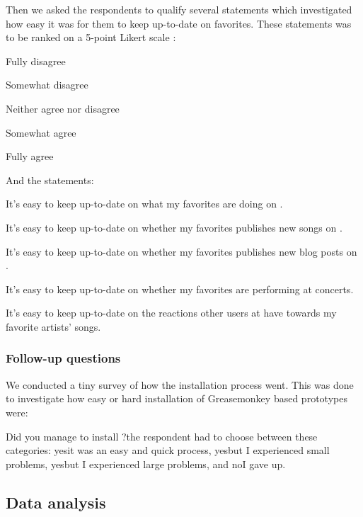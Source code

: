Then we asked the respondents to qualify several statements which investigated
how easy it was for them to keep up-to-date on favorites.
These statements
was to be ranked on a 5-point Likert scale \citep{likert32}:

\begin{items}
  \item Fully disagree
  \item Somewhat disagree
  \item Neither agree nor disagree
  \item Somewhat agree
  \item Fully agree
\end{items}

And the statements:

\begin{items}
  \item It's easy to keep up-to-date on what my favorites are doing
    on \urort{}.
  \item It's easy to keep up-to-date on whether my favorites publishes
    new songs on \urort{}.
  \item It's easy to keep up-to-date on whether my favorites publishes
    new blog posts on \urort{}.
  \item It's easy to keep up-to-date on whether my favorites are
    performing at concerts.
  \item It's easy to keep up-to-date on the reactions other users at
    \urort{} have towards my favorite artists' songs.
\end{items}

\subsubsection{Follow-up questions}

We conducted a tiny survey of how the installation process went. This
was done to investigate how easy or hard installation of Greasemonkey based
prototypes were:

\begin{items}
  \item Did you manage to install \latest{}?\dash{}the respondent had to
  choose between these categories: yes\dash{}it was an easy and quick process,
  yes\dash{}but I experienced small problems, yes\dash{}but I experienced
  large problems, and no\dash{}I gave up.
\end{items}

\subsection{Data analysis}

